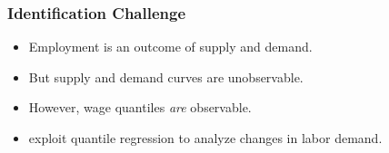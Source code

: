 \documentclass[red]{beamer}
\begin{document}
\begin{frame}
  \frametitle{Identification Challenge}
  \begin{itemize}
  \item Employment is an outcome of supply and demand.
  \item But supply and demand curves are unobservable.
  \item However, wage quantiles {\em are} observable. 
  \item \citet{Firpo2011} exploit quantile regression to analyze changes in labor demand.
  \end{itemize}
\end{frame}
\end{document}
